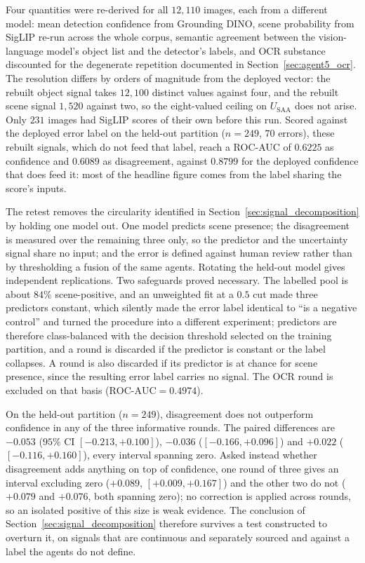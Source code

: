 \documentclass[12pt,a4paper]{report}
\begin{document}
Four quantities were re-derived for all $12{,}110$ images, each from a different model: mean detection confidence from Grounding DINO, scene probability from SigLIP re-run across the whole corpus, semantic agreement between the vision-language model's object list and the detector's labels, and OCR substance discounted for the degenerate repetition documented in Section~\ref{sec:agent5_ocr}. The resolution differs by orders of magnitude from the deployed vector: the rebuilt object signal takes $12{,}100$ distinct values against four, and the rebuilt scene signal $1{,}520$ against two, so the eight-valued ceiling on $U_{\text{SAA}}$ does not arise. Only $231$ images had SigLIP scores of their own before this run. Scored against the deployed error label on the held-out partition ($n=249$, $70$ errors), these rebuilt signals, which do not feed that label, reach a ROC-AUC of $0.6225$ as confidence and $0.6089$ as disagreement, against $0.8799$ for the deployed confidence that does feed it: most of the headline figure comes from the label sharing the score's inputs.

The retest removes the circularity identified in Section~\ref{sec:signal_decomposition} by holding one model out. One model predicts scene presence; the disagreement is measured over the remaining three only, so the predictor and the uncertainty signal share no input; and the error is defined against human review rather than by thresholding a fusion of the same agents. Rotating the held-out model gives independent replications. Two safeguards proved necessary. The labelled pool is about $84\%$ scene-positive, and an unweighted fit at a $0.5$ cut made three predictors constant, which silently made the error label identical to ``is a negative control'' and turned the procedure into a different experiment; predictors are therefore class-balanced with the decision threshold selected on the training partition, and a round is discarded if the predictor is constant or the label collapses. A round is also discarded if its predictor is at chance for scene presence, since the resulting error label carries no signal. The OCR round is excluded on that basis ($\text{ROC-AUC}=0.4974$).

On the held-out partition ($n=249$), disagreement does not outperform confidence in any of the three informative rounds. The paired differences are $-0.053$ ($95\%$ CI $[-0.213, +0.100]$), $-0.036$ ($[-0.166, +0.096]$) and $+0.022$ ($[-0.116, +0.160]$), every interval spanning zero. Asked instead whether disagreement adds anything on top of confidence, one round of three gives an interval excluding zero ($+0.089$, $[+0.009, +0.167]$) and the other two do not ($+0.079$ and $+0.076$, both spanning zero); no correction is applied across rounds, so an isolated positive of this size is weak evidence. The conclusion of Section~\ref{sec:signal_decomposition} therefore survives a test constructed to overturn it, on signals that are continuous and separately sourced and against a label the agents do not define.
\end{document}
